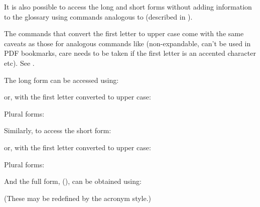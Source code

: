 \documentclass[report,inlinetitle]{nlctdoc}
\begin{document}
It is also possible to access the long and short forms without
adding information to the glossary using commands analogous to
 (described in ).

\begin{important}
The commands that convert the first letter to upper case come with
the same caveats as those for analogous commands like
 (non-expandable, can't be used in PDF bookmarks,
care needs to be taken if the first letter is an accented character
etc). See .
\end{important}

The long form can be accessed using:
\begin{definition}[\DescribeMacro{\glsentrylong}]
\end{definition}
or, with the first letter converted to upper case:
\begin{definition}[\DescribeMacro{\Glsentrylong}]
\end{definition}
Plural forms:
\begin{definition}[\DescribeMacro{\glsentrylongpl}]
\end{definition}
\begin{definition}[\DescribeMacro{\Glsentrylongpl}]
\end{definition}

Similarly, to access the short form:
\begin{definition}[\DescribeMacro{\glsentryshort}]
\end{definition}
or, with the first letter converted to upper case:
\begin{definition}[\DescribeMacro{\Glsentryshort}]
\end{definition}
Plural forms:
\begin{definition}[\DescribeMacro{\glsentryshortpl}]
\end{definition}
\begin{definition}[\DescribeMacro{\Glsentryshortpl}]
\end{definition}

And the full form,  (), can be obtained
using:
\begin{definition}[\DescribeMacro{\glsentryfull}]
\end{definition}
\begin{definition}[\DescribeMacro{\Glsentryfull}]
\end{definition}
\begin{definition}[\DescribeMacro{\glsentryfullpl}]
\end{definition}
\begin{definition}[\DescribeMacro{\Glsentryfullpl}]
\end{definition}
(These may be redefined by the acronym style.)
\end{document}
